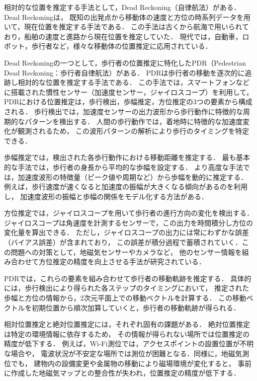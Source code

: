 相対的な位置を推定する手法として，Dead Reckoning（自律航法）がある．Dead Reckoningは，
既知の出発点から移動体の速度と方位の時系列データを用いて，現在位置を推定する手法である．
この手法は古くから航海で用いられており，船舶の速度と進路から現在位置を推定していた．
現代では，自動車，ロボット，歩行者など，様々な移動体の位置推定に応用されている．

Dead Reckoningの一つとして，歩行者の位置推定に特化したPDR（Pedestrian Dead Reckoning：歩行者自律航法）がある．
PDRは歩行者の移動を逐次的に追跡し相対的な位置を推定する手法である．
この手法では，スマートフォンなどに搭載された慣性センサー（加速度センサー，ジャイロスコープ）を利用して，
PDRにおける位置推定は，歩行検出，歩幅推定，方位推定の3つの要素から構成される．
歩行検出では，加速度センサーの出力波形から歩行動作に特徴的な周期的なパターンを検出する．
人間の歩行動作では，着地時に特徴的な加速度変化が観測されるため，
この波形パターンの解析により歩行のタイミングを特定できる．

歩幅推定では，検出された各歩行動作における移動距離を推定する．
最も基本的な手法では，歩行者の身長から平均的な歩幅を設定する．
より高度な手法では，加速度波形の特徴量（ピーク値や周期など）から歩幅を動的に推定する．
例えば，歩行速度が速くなると加速度の振幅が大きくなる傾向があるのを利用し，
加速度波形の振幅と歩幅の関係をモデル化する方法がある．

方位推定では，ジャイロスコープを用いて歩行者の進行方向の変化を検出する．
ジャイロスコープは角速度を計測するセンサーで，この出力を時間積分し方位の変化量を算出できる．
ただし，ジャイロスコープの出力には常にわずかな誤差（バイアス誤差）が含まれており，
この誤差が積分過程で蓄積されていく．この問題への対策として，地磁気センサーやカメラなど，
他のセンサー情報を組み合わせて方位推定の精度を向上させる手法が研究されている．

PDRでは，これらの要素を組み合わせて歩行者の移動軌跡を推定する．
具体的には，歩行検出により得られた各ステップのタイミングにおいて，
推定された歩幅と方位の情報から，2次元平面上での移動ベクトルを計算する．
この移動ベクトルを初期位置から順次加算していくと，歩行者の移動軌跡が得られる．

相対位置推定と絶対位置推定には，それぞれ固有の課題がある．
絶対位置推定は特定の環境情報に依存するため，
その情報が得られない場所では位置推定の精度が低下する．
例えば，Wi-Fi測位では，アクセスポイントの設置位置が不明な場合や，
電波状況が不安定な場所では測位が困難となる．同様に，地磁気測位でも，
建物内の設備変更や金属物の移動により磁場環境が変化すると，
事前に作成した地磁気マップとの整合性が失われ，位置推定の精度が低下する．

